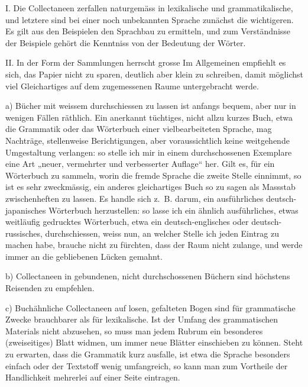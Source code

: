 I. Die Collectaneen zerfallen naturgemäss in lexikalische und grammatikalische, und letztere sind bei einer noch unbekannten Sprache zunächst die wichtigeren. Es gilt aus den Beispielen den Sprachbau zu ermitteln, und zum Verständnisse der Beispiele gehört die Kenntniss von der Bedeutung der Wörter.

II. In der Form der Sammlungen herrscht grosse  Im Allgemeinen empfiehlt es sich, das Papier nicht zu sparen, deutlich aber klein zu schreiben, damit möglichst viel Gleichartiges auf dem zugemessenen Raume untergebracht werde.

a) Bücher mit weissem  durchschiessen zu lassen ist anfangs bequem, aber nur in wenigen Fällen räthlich. Ein anerkannt tüchtiges, nicht allzu kurzes Buch, etwa die Grammatik oder das Wörterbuch einer vielbearbeiteten Sprache, mag Nachträge, stellenweise Berichtigungen, \label{fp.80} aber voraussichtlich keine weitgehende Umgestaltung verlangen: so stelle ich mir in einem durchschossenen Exemplare eine Art „neuer, vermehrter und verbesserter Auflage“ her. Gilt es, für ein Wörterbuch zu sammeln, worin die fremde Sprache die zweite Stelle einnimmt, so ist es sehr zweckmässig, ein anderes gleichartiges Buch so zu sagen als Massstab zwischenheften zu lassen. Es handle sich z.~B. darum, ein ausführliches deutsch-japanisches Wörterbuch herzustellen: so lasse ich ein ähnlich ausführliches, etwas weitläufig gedrucktes Wörterbuch, etwa ein deutsch-englisches oder deutsch-russisches, durchschiessen, weiss nun, an welcher Stelle ich jeden Eintrag zu machen habe, brauche nicht zu fürchten, dass der Raum nicht zulange, und werde immer an die gebliebenen Lücken gemahnt.

\label{sp.79}

b) Collectaneen in gebundenen, nicht durchschossenen Büchern sind höchstens Reisenden zu empfehlen.

c) Buchähnliche Collectaneen auf losen, gefalteten Bogen sind für grammatische Zwecke brauchbarer als für lexikalische. Ist der Umfang des grammatischen Materials nicht abzusehen, so muss man jedem Rubrum ein besonderes (zweiseitiges) Blatt widmen, um immer neue Blätter einschieben zu können. Steht zu erwarten, dass die Grammatik kurz ausfalle, ist etwa die Sprache besonders einfach oder der Textstoff wenig umfangreich, so kann man zum Vortheile der Handlichkeit mehrerlei auf einer Seite eintragen.

